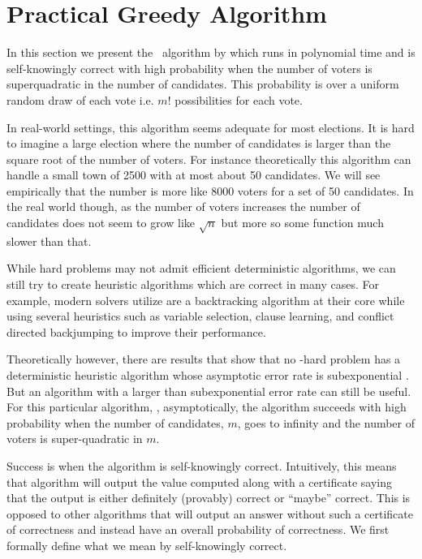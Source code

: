 \section{Practical Greedy Algorithm}\label{subsec:greedy}
In this section we present the \gwin~algorithm by \citet{heuristic}
which runs in polynomial time and is self-knowingly
correct with high probability when the number of
voters is superquadratic in the number of candidates.
This probability is over a uniform random draw of each
vote i.e. $m!$ possibilities for each vote.

In real-world settings, this algorithm seems adequate for most elections.
It is hard to imagine a large election where the number of candidates is
larger than the square root of the number of voters.
For instance theoretically
this algorithm can handle a small town of 2500 with at most about
50 candidates.
We will see empirically that the number is more like 8000 voters for a set
of 50 candidates.
In the real world though, as the number of voters increases
the number of candidates does not seem to grow like $\sqrt{n}$ but more so
some function much slower than that.

While hard problems may not admit efficient deterministic
algorithms, we can still try to create heuristic
algorithms which are correct in many cases.
For example, modern  solvers utilize are a backtracking
algorithm
at their core while using
several heuristics such as variable selection, clause learning,
and conflict directed backjumping to improve their performance.

Theoretically however, there are results that show that
no \np-hard problem has a deterministic heuristic algorithm
whose asymptotic error rate is subexponential \citep{heuristic2012}.
But an algorithm with a larger than subexponential error rate can
still be useful.
For this particular algorithm, \gscore, asymptotically, the algorithm succeeds with
high probability when the number of candidates, $m$, goes to infinity
and the number of voters is super-quadratic in $m$.

Success is when the algorithm is self-knowingly correct.
Intuitively, this means that algorithm will output the value computed along with
a certificate saying that the output is either definitely (provably) correct or ``maybe''
correct.
This is opposed to other algorithms that will output an answer without such
a certificate of correctness and instead have an overall probability of correctness.
We first formally define what we mean by self-knowingly correct.

